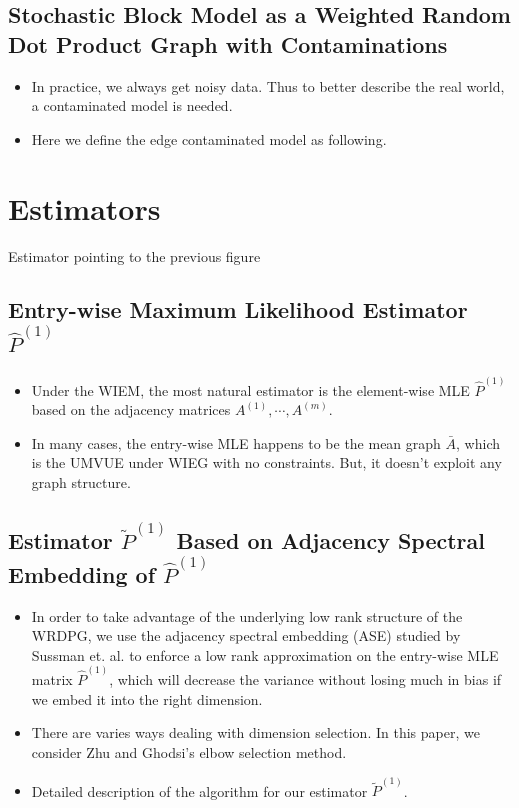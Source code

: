 \documentclass[a4paper]{article}
\begin{document}
\subsection{Stochastic Block Model as a Weighted Random Dot Product Graph with Contaminations}
\begin{itemize}
\item In practice, we always get noisy data. Thus to better describe the real world, a contaminated model is needed.
\item Here we define the edge contaminated model as following.
\end{itemize}





\section{Estimators}
Estimator pointing to the previous figure

\subsection{Entry-wise Maximum Likelihood Estimator $\hat{P}^{(1)}$}
\begin{itemize}
\item Under the WIEM, the most natural estimator is the element-wise MLE $\hat{P}^{(1)}$ based on the adjacency matrices $A^{(1)}, \cdots, A^{(m)}$.
\item In many cases, the entry-wise MLE happens to be the mean graph $\bar{A}$, which is the UMVUE under WIEG with no constraints. But, it doesn't exploit any graph structure. 
\end{itemize}



\subsection{Estimator $\widetilde{P}^{(1)}$ Based on Adjacency Spectral Embedding of $\hat{P}^{(1)}$}
\begin{itemize}
\item In order to take advantage of the underlying low rank structure of the WRDPG, we use the adjacency spectral embedding (ASE) studied by Sussman et. al. to enforce a low rank approximation on the entry-wise MLE matrix $\hat{P}^{(1)}$, which will decrease the variance without losing much in bias if we embed it into the right dimension.
\item There are varies ways dealing with dimension selection. In this paper, we consider Zhu and Ghodsi's elbow selection method.
\item Detailed description of the algorithm for our estimator $\widetilde{P}^{(1)}$.
\end{itemize}
\end{document}

